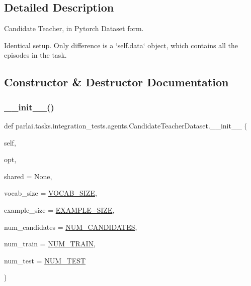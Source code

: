 \subsection{Detailed Description}
\begin{DoxyVerb}Candidate Teacher, in Pytorch Dataset form.

Identical setup. Only difference is a `self.data` object, which contains all the
episodes in the task.
\end{DoxyVerb}
 

\subsection{Constructor \& Destructor Documentation}
\mbox{\label{classparlai_1_1tasks_1_1integration__tests_1_1agents_1_1CandidateTeacherDataset_a6279dc2fe37fc6dad619ba34442d044d}} 
\subsubsection{\texorpdfstring{\+\_\+\+\_\+init\+\_\+\+\_\+()}{\_\_init\_\_()}}
{\footnotesize\ttfamily def parlai.\+tasks.\+integration\+\_\+tests.\+agents.\+Candidate\+Teacher\+Dataset.\+\_\+\+\_\+init\+\_\+\+\_\+ (\begin{DoxyParamCaption}\item[{}]{self,  }\item[{}]{opt,  }\item[{}]{shared = {\ttfamily None},  }\item[{}]{vocab\+\_\+size = {\ttfamily \hyperlink{namespaceparlai_1_1tasks_1_1integration__tests_1_1agents_acce0481273f02014fb577733cfa8f2b7}{V\+O\+C\+A\+B\+\_\+\+S\+I\+ZE}},  }\item[{}]{example\+\_\+size = {\ttfamily \hyperlink{namespaceparlai_1_1tasks_1_1integration__tests_1_1agents_a1a9a556c90b625c74c9afd0a1a82ca3c}{E\+X\+A\+M\+P\+L\+E\+\_\+\+S\+I\+ZE}},  }\item[{}]{num\+\_\+candidates = {\ttfamily \hyperlink{namespaceparlai_1_1tasks_1_1integration__tests_1_1agents_a43719015a313515dcd768b12491ec3a1}{N\+U\+M\+\_\+\+C\+A\+N\+D\+I\+D\+A\+T\+ES}},  }\item[{}]{num\+\_\+train = {\ttfamily \hyperlink{namespaceparlai_1_1tasks_1_1integration__tests_1_1agents_abc5a5ed634c3ec4aa371a49b883d37a1}{N\+U\+M\+\_\+\+T\+R\+A\+IN}},  }\item[{}]{num\+\_\+test = {\ttfamily \hyperlink{namespaceparlai_1_1tasks_1_1integration__tests_1_1agents_ad6197fa4ad385bde5542da3aa644ad8b}{N\+U\+M\+\_\+\+T\+E\+ST}} }\end{DoxyParamCaption})}



